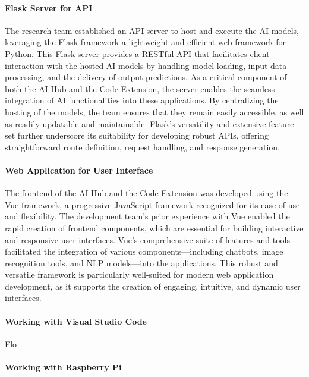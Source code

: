 \paragraph{Flask Server for API}

The research team established an API server to host and execute the AI models, leveraging the Flask framework a lightweight and efficient web framework for Python. This Flask server provides a RESTful API that facilitates client interaction with the hosted AI models by handling model loading, input data processing, and the delivery of output predictions. As a critical component of both the AI Hub and the Code Extension, the server enables the seamless integration of AI functionalities into these applications. By centralizing the hosting of the models, the team ensures that they remain easily accessible, as well as readily updatable and maintainable. Flask’s versatility and extensive feature set further underscore its suitability for developing robust APIs, offering straightforward route definition, request handling, and response generation.

\paragraph{Web Application for User Interface}

The frontend of the AI Hub and the Code Extension was developed using the Vue framework, a progressive JavaScript framework recognized for its ease of use and flexibility. The development team’s prior experience with Vue enabled the rapid creation of frontend components, which are essential for building interactive and responsive user interfaces. Vue’s comprehensive suite of features and tools facilitated the integration of various components—including chatbots, image recognition tools, and NLP models—into the applications. This robust and versatile framework is particularly well-suited for modern web application development, as it supports the creation of engaging, intuitive, and dynamic user interfaces.

\paragraph{Working with Visual Studio Code}

Flo

\paragraph{Working with Raspberry Pi}   

